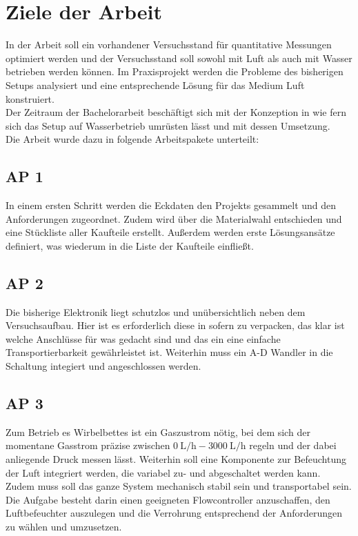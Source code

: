 \section{Ziele der Arbeit}

In der Arbeit soll ein vorhandener Versuchsstand für quantitative Messungen optimiert werden und der Versuchsstand soll sowohl mit Luft als auch mit Wasser betrieben werden können. Im Praxisprojekt werden die Probleme des bisherigen Setups analysiert und eine entsprechende Lösung für das Medium Luft konstruiert. \\ 
Der Zeitraum der Bachelorarbeit beschäftigt sich mit der Konzeption in wie fern sich das Setup auf Wasserbetrieb umrüsten lässt und mit dessen Umsetzung. \\
Die Arbeit wurde dazu in folgende Arbeitspakete unterteilt:


\subsection{AP 1}

In einem ersten Schritt werden die Eckdaten den Projekts gesammelt und den Anforderungen zugeordnet. Zudem wird über die Materialwahl entschieden und eine Stückliste aller Kaufteile erstellt. Außerdem werden erste Lösungsansätze definiert, was wiederum in die Liste der Kaufteile einfließt.


\subsection{AP 2}

Die bisherige Elektronik liegt schutzlos und unübersichtlich neben dem Versuchsaufbau. Hier ist es erforderlich diese in sofern zu verpacken, das klar ist welche Anschlüsse für was gedacht sind und das ein eine einfache Transportierbarkeit gewährleistet ist.
Weiterhin muss ein A-D Wandler in die Schaltung integiert und angeschlossen werden.

\subsection{AP 3}

Zum Betrieb es Wirbelbettes ist ein Gaszustrom nötig, bei dem sich der momentane Gasstrom präzise zwischen $\SI{0}{\liter / \hour} - \SI{3000}{\liter / \hour}$ regeln und der dabei anliegende Druck messen lässt. Weiterhin soll eine Komponente zur Befeuchtung der Luft integriert werden, die variabel zu- und abgeschaltet werden kann. \\
Zudem muss soll das ganze System mechanisch stabil sein und transportabel sein. \\
Die Aufgabe besteht darin einen geeigneten Flowcontroller anzuschaffen, den Luftbefeuchter auszulegen und die Verrohrung entsprechend der Anforderungen zu wählen und umzusetzen.

